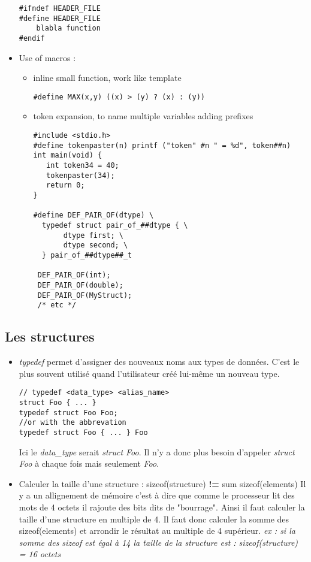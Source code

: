 \documentclass[12pt,a4paper]{article}
\begin{document}
\begin{itemize}
\begin{lstlisting}
#ifndef HEADER_FILE
#define HEADER_FILE
	blabla function
#endif
\end{lstlisting}
\item Use of macros : 
\begin{itemize}
\item inline small function, work like template
\begin{lstlisting}
#define MAX(x,y) ((x) > (y) ? (x) : (y))
\end{lstlisting}
\item token expansion, to name multiple variables adding prefixes
\begin{lstlisting}
#include <stdio.h>
#define tokenpaster(n) printf ("token" #n " = %d", token##n)
int main(void) {
   int token34 = 40;
   tokenpaster(34);
   return 0;
}

#define DEF_PAIR_OF(dtype) \
  typedef struct pair_of_##dtype { \
       dtype first; \
       dtype second; \
  } pair_of_##dtype##_t 

 DEF_PAIR_OF(int);
 DEF_PAIR_OF(double);
 DEF_PAIR_OF(MyStruct);
 /* etc */
\end{lstlisting}
\end{itemize}
\end{itemize}


\subsection{Les structures}
\begin{itemize}
\item \textit{typedef} permet d'assigner des nouveaux noms aux types de données. C'est le plus souvent utilisé quand l'utilisateur créé lui-même un nouveau type. 
\begin{lstlisting}
// typedef <data_type> <alias_name>
struct Foo { ... }
typedef struct Foo Foo;
//or with the abbrevation
typedef struct Foo { ... } Foo 
\end{lstlisting}
Ici le \textit{data\_type} serait \textit{struct Foo}. Il n'y a donc plus besoin d'appeler \textit{struct Foo} à chaque fois mais seulement \textit{Foo}.
\item Calculer la taille d'une structure : sizeof(structure) \textbf{!=} sum sizeof(elements)
\newline Il y a un allignement de mémoire c'est à dire que comme le processeur lit des mots de 4 octets il rajoute des bits dits de "bourrage". Ainsi il faut calculer la taille d'une structure en multiple de 4.
\newline Il faut donc calculer la somme des sizeof(elements) et arrondir le résultat au multiple de 4 supérieur. \textit{ex : si la somme des sizeof est égal à 14 la taille de la structure est : sizeof(structure) = 16 octets}
\end{itemize}
\end{document}
